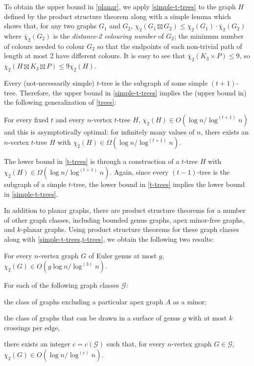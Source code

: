 \documentclass[kpfonts]{patmorin}
\newcommand{\trn}{\chi_2}
\newcommand{\dtcn}{\bar{\chi}_2}
\theoremstyle{named}
\begin{document}
To obtain the upper bound in \cref{planar}, we apply \cref{simple-t-trees} to the graph $H$ defined by the product structure theorem along with a simple lemma which shows that, for any two graphs $G_1$ and $G_2$, $\trn(G_1\boxtimes G_2)\le \trn(G_1)\cdot\dtcn(G_2)$ where $\dtcn(G_2)$ is the \emph{distance-2 colouring number} of $G_2$;  the minimum number of colours needed to colour $G_2$ so that the endpoints of each non-trivial path of length at most 2 have different colours.  It is easy to see that $\dtcn(K_3\times P)\le 9$, so $\trn(H\boxtimes K_3\boxtimes P)\le 9\trn(H)$.

Every (not-necessarily simple) $t$-tree is the subgraph of some simple $(t+1)$-tree. Therefore, the upper bound in \cref{simple-t-trees} implies the (upper bound in) the following generalization of \cref{trees}:

\begin{thm}\label{t-trees}
    For every fixed $t$ and every $n$-vertex $t$-tree $H$, $\trn(H) \in O(\log n/\log^{(t+1)} n)$ and this is asymptotically optimal: for infinitely many values of $n$, there exists an $n$-vertex $t$-tree $H$ with $\trn(H)\in\Omega(\log n/\log^{(t+1)} n)$.
\end{thm}

The lower bound in \cref{t-trees} is through a construction of a $t$-tree $H$ with
$\trn(H)\in\Omega(\log n/\log^{(t+1)} n)$.  Again, since every $(t-1)$-tree is the subgraph of a simple $t$-tree, the lower bound in \cref{t-trees} implies the lower bound in \cref{simple-t-trees}.

In addition to planar graphs, there are product structure theorems for a number of other graph classes, including bounded genus graphs, apex minor-free graphs, and $k$-planar graphs.  Using product structure theorems for these graph classes along with \cref{simple-t-trees,t-trees}, we obtain the following two results:

\begin{thm}\label{bounded-genus}
    For every $n$-vertex graph $G$ of Euler genus at most $g$, $\trn(G)\in O(g\log n/\log^{(3)} n)$.
\end{thm}

\begin{thm}\label{meta-theorem}\label{meta}
    For each of the following graph classes $\mathcal{G}$:
    \begin{compactenum}
        \item the class of graphs excluding a particular apex graph $A$ as a minor;
        \item the class of graphs that can be drawn in a surface of genus $g$ with at most $k$ crossings per edge,
    \end{compactenum}
    there exists an integer $c=c(\mathcal{G})$ such that, for every $n$-vertex graph $G\in\mathcal{G}$, $\trn(G)\in O(\log n/\log^{(c)} n)$.
\end{thm}
\end{document}
